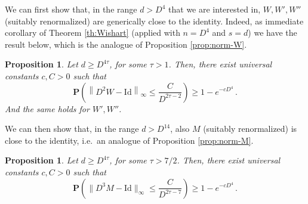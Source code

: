 \documentclass{amsart}
\newtheorem{proposition}[theorem]{Proposition}
\renewcommand{\P}{\mathbf{P}}
\renewcommand{\leq}{\leqslant}
\renewcommand{\geq}{\geqslant}
\newcommand{\Id}{\mathrm{Id}}
\begin{document}
We can first show that, in the range $d>D^4$ that we are interested in, $W,W',W''$ (suitably renormalized) are generically close to the identity. Indeed, as immediate corollary of Theorem \ref{th:Wishart} (applied with $n=D^4$ and $s=d$) we have the result below, which is the analogue of Proposition \ref{prop:norm-W}.

\begin{proposition} \label{prop:norm-W-PEPS}
    Let $d\geq D^{4\tau}$, for some $\tau>1$. Then, there exist universal constants $c,C>0$ such that
    \[ \P\left( \left\|D^2W-\Id\right\|_{\infty} \leq \frac{C}{D^{2\tau-2}} \right) \geq 1-e^{-cD^4} \, . \]
    And the same holds for $W',W''$.
\end{proposition}

We can then show that, in the range $d>D^{14}$, also $M$ (suitably renormalized) is close to the identity, i.e.~an analogue of Proposition \ref{prop:norm-M}.

\begin{proposition} \label{prop:norm-M-PEPS}
    Let $d\geq D^{4\tau}$, for some $\tau>7/2$. Then, there exist universal constants $c,C>0$ such that
    \[ \P\left( \|D^3M-\Id\|_{\infty} \leq \frac{C}{D^{2\tau-7}} \right) \geq 1-e^{-cD^4} \, . \]
\end{proposition}
\end{document}
